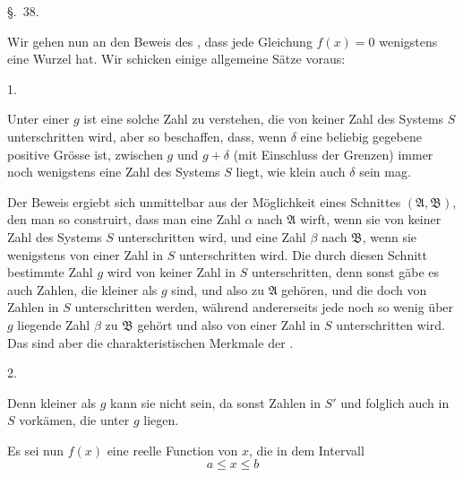 
\begin{center}
{\large \S.\ 38.}

\vspace{0.5em}
{\large{}}
\end{center}

Wir gehen nun an den Beweis des , dass jede Gleichung $f(x)=0$ wenigstens eine Wurzel hat. Wir schicken einige allgemeine Sätze voraus:

1. 

Unter einer  $g$ ist eine solche Zahl zu verstehen, die von keiner Zahl des Systems $S$ unterschritten wird, aber so beschaffen, dass, wenn $\delta$ eine beliebig gegebene positive Grösse ist, zwischen $g$ und $g+\delta$ (mit Einschluss der Grenzen) immer noch wenigstens eine Zahl des Systems $S$ liegt, wie klein auch $\delta$ sein mag.

Der Beweis ergiebt sich unmittelbar aus der Möglichkeit eines Schnittes $(\mathfrak A,\mathfrak B)$, den man so construirt, dass man eine Zahl $\alpha$ nach $\mathfrak A$ wirft, wenn sie von keiner Zahl des Systems $S$ unterschritten wird, und eine Zahl $\beta$ nach $\mathfrak B$, wenn sie wenigstens von einer Zahl in $S$ unterschritten wird. Die durch diesen Schnitt bestimmte Zahl $g$ wird von keiner Zahl in $S$ unterschritten, denn sonst gäbe es auch Zahlen, die kleiner als $g$ sind, und also zu $\mathfrak A$ gehören, und die doch von Zahlen in $S$ unterschritten werden, während andererseits jede noch so wenig über $g$ liegende Zahl $\beta$ zu $\mathfrak B$ gehört und also von einer Zahl in $S$ unterschritten wird. Das sind aber die charakteristischen Merkmale der .

2. 

Denn kleiner als $g$ kann sie nicht sein, da sonst Zahlen in $S'$ und folglich auch in $S$ vorkämen, die unter $g$ liegen.

Es sei nun $f(x)$ eine reelle Function von $x$, die in dem Intervall
\begin{equation}
 a\le x\le b
\tag{1}
\end{equation}
